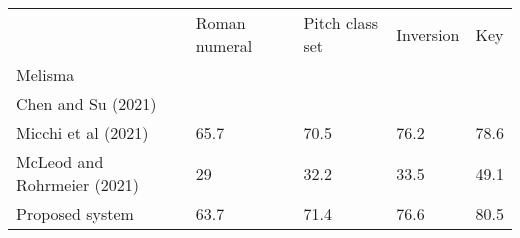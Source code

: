 \begin{tabular}{lllll}
                            & Roman numeral & Pitch class set & Inversion & Key  \\
Melisma                     &               &                 &           &      \\
Chen and Su (2021)          &               &                 &           &      \\
Micchi et al (2021)         & 65.7          & 70.5            & 76.2      & 78.6 \\
McLeod and Rohrmeier (2021) & 29            & 32.2            & 33.5      & 49.1 \\
Proposed system             & 63.7          & 71.4            & 76.6      & 80.5
\end{tabular}
